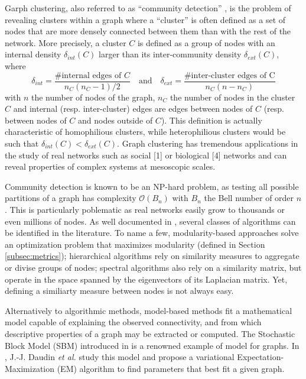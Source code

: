 \documentclass[10pt]{article}
\renewcommand{\O}{\mathcal{O}}
\begin{document}
Garph clustering, also referred to as ``community detection'' \cite{fortunato_community_2010}, is the problem of revealing clusters within a graph where a ``cluster'' is often defined as a set of nodes that are more densely connected between them than with the rest of the network.
More precisely, a cluster $C$ is defined as a group of nodes with an internal density $\delta_{int}(C)$ larger than its inter-community density $\delta_{ext}(C)$, where
\begin{equation}
    \delta_{int} = \frac{\text{\# internal edges of }C}{n_C (n_C - 1) / 2} \quad \text{and} \quad \delta_{ext} = \frac{\text{\# inter-cluster edges of C}}{n_C (n - n_C)}
\end{equation}
with $n$ the number of nodes of the graph, $n_C$ the number of nodes in the cluster $C$ and internal (resp. inter-cluster) edges are edges between nodes of $C$ (resp. between nodes of $C$ and nodes outside of $C$). This definition is actually characteristic of homophilious clusters, while heterophilious clusters would be such that $\delta_{int}(C) < \delta_{ext}(C)$.
Graph clustering has tremendous applications in the study of real networks such as
social [1] or biological [4] networks and can reveal properties of complex systems at mesoscopic scales.

Community detection is known to be an NP-hard problem, as testing all possible partitions of a graph has complexity $\O(B_n)$ with $B_n$ the Bell number of order $n$. This is particularly poblematic as real networks easily grow to thousands or even millions of nodes. As well documented in \cite{fortunato_community_2010}, several classes of algorithms can be identified in the literature. To name a few, modularity-based approaches solve an optimization problem that maximizes modularity (defined in Section \ref{subsec:metrics}); hierarchical algorithms rely on similarity measures to aggregate or divise groups of nodes; spectral algorithms also rely on a similarity matrix, but operate in the space spanned by the eigenvectors of its Laplacian matrix. Yet, defining a similiarty measure between nodes is not always easy.

Alternatively to algorithmic methods, model-based methods fit a mathematical model capable of explaining the observed connectivity, and from which descriptive properties of a graph may be extracted or computed. The Stochastic Block Model (SBM) introduced in \cite{snijders_estimation_1997} is a renowned example of model for graphs. In \cite{main_article}, J.-J. Daudin \textit{et al.} study this model and propose a variational Expectation-Maximization (EM) algorithm to find parameters that best fit a given graph.
\end{document}
